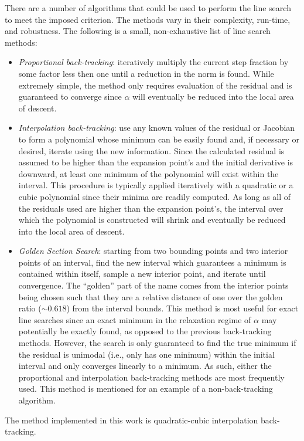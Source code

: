 There are a number of algorithms that could be used to perform the line search to meet the imposed criterion.
The methods vary in their complexity, run-time, and robustness.
The following is a small, non-exhaustive list of line search methods:
\begin{itemize}
	\item{\textit{Proportional back-tracking}: 
        iteratively multiply the current step fraction by some factor less then one until a reduction in the norm is found.
        While extremely simple, the method only requires evaluation of the residual and is guaranteed to converge since $\alpha$ will eventually be reduced into the local area of descent.
    }
    \item{\textit{Interpolation back-tracking}:
        use any known values of the residual or Jacobian to form a polynomial whose minimum can be easily found and, if necessary or desired, iterate using the new information.
        Since the calculated residual is assumed to be higher than the expansion point's and the initial derivative is downward, at least one minimum of the polynomial will exist within the interval.
        This procedure is typically applied iteratively with a quadratic or a cubic polynomial since their minima are readily computed.
        As long as all of the residuals used are higher than the expansion point's, the interval over which the polynomial is constructed will shrink and eventually be reduced into the local area of descent.
    }
    \item{\textit{Golden Section Search}:
        starting from two bounding points and two interior points of an interval, find the new interval which guarantees a minimum is contained within itself, sample a new interior point, and iterate until convergence.
        The ``golden'' part of the name comes from the interior points being chosen such that they are a relative distance of one over the golden ratio ($\sim0.618$) from the interval bounds.
        This method is most useful for exact line searches since an exact minimum in the relaxation regime of $\alpha$ may potentially be exactly found, as opposed to the previous back-tracking methods.
        However, the search is only guaranteed to find the true minimum if the residual is unimodal (i.e., only has one minimum) within the initial interval and only converges linearly to a minimum.
        As such, either the proportional and interpolation back-tracking methods are most frequently used.
        This method is mentioned for an example of a non-back-tracking algorithm.
    }
\end{itemize}
The method implemented in this work is quadratic-cubic interpolation back-tracking.



